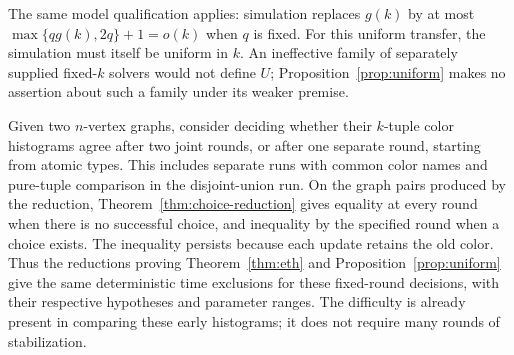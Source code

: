 The same model qualification applies: simulation replaces \(g(k)\) by
at most \(\max\{qg(k),2q\}+1=o(k)\) when \(q\) is fixed.
For this uniform transfer, the simulation must itself be uniform in \(k\).
An ineffective family of separately supplied fixed-\(k\) solvers would
not define \(U\); Proposition~\ref{prop:uniform} makes no assertion
about such a family under its weaker premise.

Given two \(n\)-vertex graphs, consider deciding whether their
\(k\)-tuple color histograms agree after two joint rounds, or after
one separate round, starting from atomic types. This includes separate
runs with common color names and pure-tuple comparison in the
disjoint-union run. On the graph pairs produced by the reduction,
Theorem~\ref{thm:choice-reduction} gives equality at every round when
there is no successful choice, and inequality by the specified round
when a choice exists. The inequality persists because each update
retains the old color. Thus the reductions proving
Theorem~\ref{thm:eth} and Proposition~\ref{prop:uniform} give the same
deterministic time exclusions for these fixed-round decisions, with
their respective hypotheses and parameter ranges. The difficulty is
already present in comparing these early histograms; it does not require
many rounds of stabilization.
